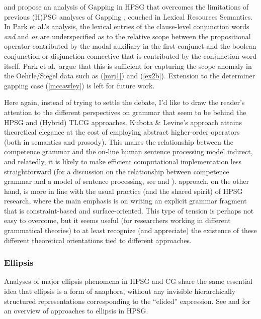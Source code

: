 \documentclass[output=paper
                ,modfonts
                ,nonflat
	        ,collection
	        ,collectionchapter
	        ,collectiontoclongg
 	        ,biblatex
                ,babelshorthands
                ,newtxmath
                ,draftmode
                ,colorlinks, citecolor=brown
]{./langsci/langscibook}
\begin{document}
\citet{parkea18gapping} and \citet{parkDiss} propose an analysis of Gapping in HPSG that
overcomes the limitations of previous (H)PSG analyses of Gapping
\citep{sgww,chaves05,abeille-ea}, couched in Lexical Resources Semantics.
In Park et al.'s analysis, the lexical entries of the clause-level conjunction
words \textit{and} and \textit{or} are underspecified as to the relative scope
between the propositional operator contributed by the modal auxiliary
in the first conjunct and the boolean conjunction or disjunction
connective that is contributed by the conjunction word itself. Park et
al.\ argue that this is sufficient for capturing the scope anomaly in the
Oehrle/Siegel data such as (\ref{mrj1}) and (\ref{ex2b}). Extension to
the determiner gapping case (\ref{mccawley}) is left for future work.

Here again, instead of trying to settle the debate, I'd like to draw
the reader's attention to the different perspectives on grammar that
seem to be behind the HPSG and (Hybrid) TLCG approaches. Kubota \&
Levine's approach attains theoretical elegance at the cost of
employing abstract higher-order operators (both in semantics and
prosody). This makes the relationship between the competence grammar
and the on-line human sentence processing model indirect, and
relatedly, it is likely to make efficient computational implementation
less straightforward (for a discussion on the relationship between
competence grammar and a model of sentence processing, see
 and ).
 approach, on the 
other hand, is more in line with the usual practice (and the shared
spirit) of HPSG research, where the main emphasis is on writing an
explicit grammar fragment that is constraint-based and
surface-oriented. This type of tension is perhaps not easy to
overcome, but it seems useful (for researchers working in different
grammatical theories) to at least recognize (and appreciate) the
existence of these different theoretical orientations tied to
different approaches.



\subsubsection{Ellipsis}

Analyses of major ellipsis phenomena in HPSG and CG share the same
essential idea that ellipsis is a form of anaphora, without any
invisible hierarchically structured representations corresponding to
the ``elided'' expression. See  and
\citet{ginzburg-miller-ellipsis-handbook} for an
overview of approaches to ellipsis in HPSG.
\end{document}
